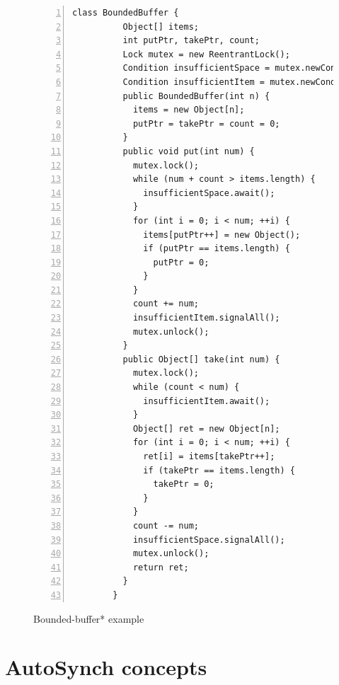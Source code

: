 \documentclass[preprint]{sigplanconf}
\begin{document}
\begin{figure}[ht!]
    \begin{Verbatim}[fontsize=\footnotesize,gobble=8,frame=lines,
            framesep=5mm,numbers=left,numbersep=2pt,
            label=\fbox{\small\emph{Explicit-Signal}}]
        class BoundedBuffer {
          Object[] items;  
          int putPtr, takePtr, count;
          Lock mutex = new ReentrantLock();
          Condition insufficientSpace = mutex.newCondition();
          Condition insufficientItem = mutex.newCondition();
          public BoundedBuffer(int n) {
            items = new Object[n];
            putPtr = takePtr = count = 0;
          }
          public void put(int num) {
            mutex.lock();
            while (num + count > items.length) {
              insufficientSpace.await();
            }
            for (int i = 0; i < num; ++i) {
              items[putPtr++] = new Object();
              if (putPtr == items.length) {
                putPtr = 0;
              }
            }
            count += num;
            insufficientItem.signalAll();
            mutex.unlock();
          }
          public Object[] take(int num) {
            mutex.lock();
            while (count < num) {
              insufficientItem.await();
            }
            Object[] ret = new Object[n];
            for (int i = 0; i < num; ++i) {
              ret[i] = items[takePtr++];
              if (takePtr == items.length) {
                takePtr = 0;
              }
            }
            count -= num;
            insufficientSpace.signalAll();
            mutex.unlock();
            return ret;
          }
        }
    \end{Verbatim}
    \caption{Bounded-buffer* example}
    \label{fig:sigAll_exp}
\end{figure}


\section{AutoSynch concepts} \label{sec:concept}
\end{document}
